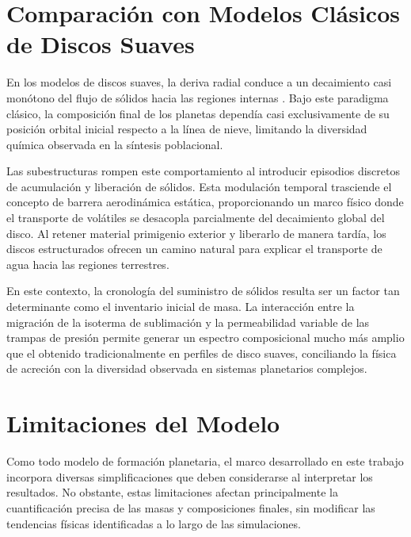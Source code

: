\section{Comparación con Modelos Clásicos de Discos Suaves}

En los modelos de discos suaves, la deriva radial conduce a un decaimiento casi monótono del flujo de sólidos hacia las regiones internas \citep{Lambrechts2014,Ormel2017}. Bajo este paradigma clásico, la composición final de los planetas dependía casi exclusivamente de su posición orbital inicial respecto a la línea de nieve, limitando la diversidad química observada en la síntesis poblacional.

Las subestructuras rompen este comportamiento al introducir episodios discretos de acumulación y liberación de sólidos. Esta modulación temporal trasciende el concepto de barrera aerodinámica estática, proporcionando un marco físico donde el transporte de volátiles se desacopla parcialmente del decaimiento global del disco. Al retener material primigenio exterior y liberarlo de manera tardía, los discos estructurados ofrecen un camino natural para explicar el transporte de agua hacia las regiones terrestres.

En este contexto, la cronología del suministro de sólidos resulta ser un factor tan determinante como el inventario inicial de masa. La interacción entre la migración de la isoterma de sublimación y la permeabilidad variable de las trampas de presión permite generar un espectro composicional mucho más amplio que el obtenido tradicionalmente en perfiles de disco suaves, conciliando la física de acreción con la diversidad observada en sistemas planetarios complejos.



\section{Limitaciones del Modelo}

Como todo modelo de formación planetaria, el marco desarrollado en este trabajo incorpora diversas simplificaciones que deben considerarse al interpretar los resultados. No obstante, estas limitaciones afectan principalmente la cuantificación precisa de las masas y composiciones finales, sin modificar las tendencias físicas identificadas a lo largo de las simulaciones.

